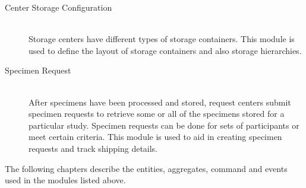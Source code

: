 \begin{description}
  \item[Center Storage Configuration] \hfill \\ Storage centers have different
    types of storage containers. This module is used to define the layout of
    storage containers and also storage hierarchies.

  \item[Specimen Request] \hfill \\ After specimens have been processed and
    stored, request centers submit specimen requests to retrieve some or all of
    the specimens stored for a particular study. Specimen requests can be done
    for sets of participants or meet certain criteria. This module is used to
    aid in creating specimen requests and track shipping details.

\end{description}

The following chapters describe the entities, aggregates, command and events
used in the  modules listed above.

